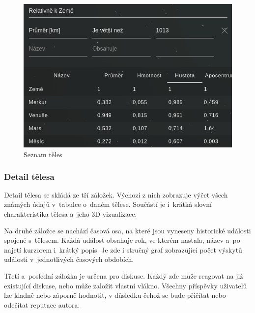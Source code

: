 \documentclass[a4paper,12pt]{article}
\begin{document}
\begin{figure}[H]
\begin{center}
\includegraphics[width=350pt]{Images/Bodies.png}
\caption{Seznam těles}
\end{center}
\end{figure}

\vspace*{-1cm}
\subsubsection{Detail tělesa}

Detail tělesa se skládá ze tří záložek. Výchozí z nich zobrazuje výčet všech známých údajů v~tabulce o~daném tělese. Součástí je i~krátká slovní charakteristika tělesa a~jeho 3D vizualizace.

Na druhé záložce se nachází časová osa, na které jsou vyneseny historické události spojené s~tělesem. Každá událost obsahuje rok, ve kterém nastala, název a~po najetí kurzorem  i~krátký popis. Je zde i stručný graf zobrazující počet výskytů události v~jednotlivých časových obdobích.

Třetí a~poslední záložka je určena pro diskuse. Každý zde může reagovat na již existující diskuse, nebo může založit vlastní vlákno. Všechny příspěvky uživatelů lze kladně nebo záporně hodnotit, v důsledku čehož se bude přičítat nebo odečítat reputace autora.
\end{document}
